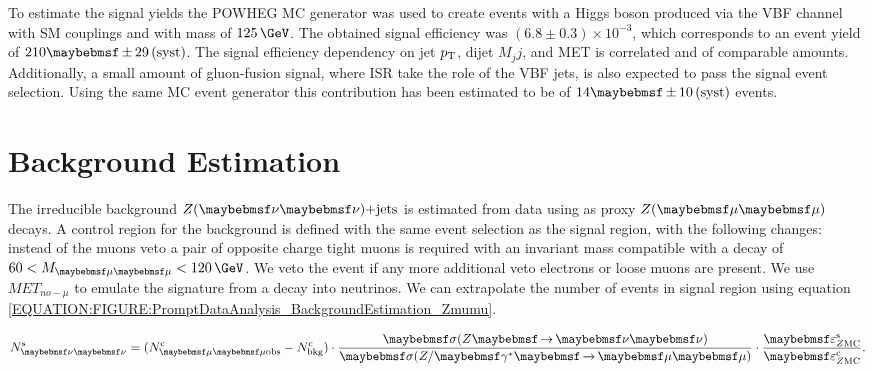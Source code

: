 To estimate the signal yields the \textsc{POWHEG} \gls{MC} generator was used to create events with a Higgs boson produced via the \gls{VBF} channel with \gls{SM} couplings and with mass of $125\,\GeV$. The obtained signal efficiency was $(6.8 \pm 0.3) \times 10^{-3}$, which corresponds to an event yield of $210 \pm 29\syst$. The signal efficiency dependency on jet $p_{\mathrm{T}}$, dijet $M_jj$, and \gls{MET} is correlated and of comparable amounts. Additionally, a small amount of gluon-fusion signal, where \gls{ISR} take the role of the \gls{VBF} jets, is also expected to pass the signal event selection. Using the same \gls{MC} event generator this contribution has been estimated to be of $14 \pm 10\syst$ events.

\section{Background Estimation}


The irreducible background $\Z(\nu \nu)\text{+jets}$ is estimated from data using as proxy $\Z (\mu \mu)$ decays. A control region for the \Z background is defined with the same event selection as the signal region, with the following changes: instead of the muons veto a pair of opposite charge tight muons is required with an invariant mass compatible with a \Z decay of $60 < M_{\mu\mu}<120\,\GeV$. We veto the event if any more additional veto electrons or loose muons are present. We use $MET_{no-\mu}$ to emulate the signature from a \Z decay into neutrinos. We can extrapolate the number of events in signal region using equation \ref{EQUATION:FIGURE:PromptDataAnalysis_BackgroundEstimation_Zmumu}.

\begin{equation}
N^\mathrm{s}_{\nu\nu} = (N^\mathrm{c}_{\mu\mu\text{obs}} - N^\mathrm{c}_\text{bkg}) \cdot \frac{\sigma(\Z \to \nu\nu)}{\sigma(\Z/\gamma^{*} \to \mu\mu)} \cdot \frac{\varepsilon^\mathrm{s}_{\Z \mathrm{MC}}}{\varepsilon^\mathrm{c}_{\Z \mathrm{MC}}}.
\label{EQUATION:FIGURE:PromptDataAnalysis_BackgroundEstimation_Zmumu}
\end{equation}


